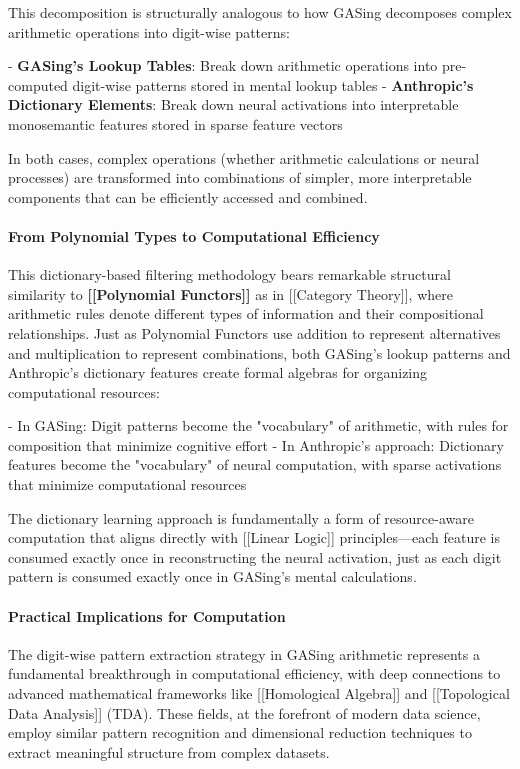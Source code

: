 This decomposition is structurally analogous to how GASing decomposes complex arithmetic operations into digit-wise patterns:

- \textbf{GASing's Lookup Tables}: Break down arithmetic operations into pre-computed digit-wise patterns stored in mental lookup tables
- \textbf{Anthropic's Dictionary Elements}: Break down neural activations into interpretable monosemantic features stored in sparse feature vectors

In both cases, complex operations (whether arithmetic calculations or neural processes) are transformed into combinations of simpler, more interpretable components that can be efficiently accessed and combined.
\paragraph{From Polynomial Types to Computational Efficiency}

This dictionary-based filtering methodology bears remarkable structural similarity to \textbf{[[Polynomial Functors]]} as in [[Category Theory]], where arithmetic rules denote different types of information and their compositional relationships. Just as Polynomial Functors use addition to represent alternatives and multiplication to represent combinations, both GASing's lookup patterns and Anthropic's dictionary features create formal algebras for organizing computational resources:

- In GASing: Digit patterns become the "vocabulary" of arithmetic, with rules for composition that minimize cognitive effort
- In Anthropic's approach: Dictionary features become the "vocabulary" of neural computation, with sparse activations that minimize computational resources

The dictionary learning approach is fundamentally a form of resource-aware computation that aligns directly with [[Linear Logic]] principles—each feature is consumed exactly once in reconstructing the neural activation, just as each digit pattern is consumed exactly once in GASing's mental calculations.
\paragraph{Practical Implications for Computation}

The digit-wise pattern extraction strategy in GASing arithmetic represents a fundamental breakthrough in computational efficiency, with deep connections to advanced mathematical frameworks like [[Homological Algebra]] and [[Topological Data Analysis]] (TDA). These fields, at the forefront of modern data science, employ similar pattern recognition and dimensional reduction techniques to extract meaningful structure from complex datasets.

